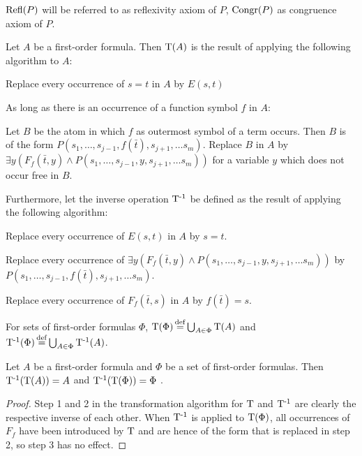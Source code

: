 $\operatorname{Refl}(P)$ will be referred to as reflexivity axiom of $P$, $\operatorname{Congr}(P)$ as congruence axiom of $P$.

\begin{defi}[label=exa:cont]
	\label{def:trans}
	Let $A$ be a first-order formula. Then $\operatorname{T}(A)$ is the result of applying the following algorithm to $A$:
	\begin{compactenum}
	\item Replace every occurrence of $s=t$ in $A$ by $E(s, t)$
	\label{def:trans_step1}
	\item As long as there is an occurrence of a function symbol $f$ in $A$:
	\label{def:trans_step2}

		Let $B$ be the atom in which $f$ as outermost symbol of a term occurs.
		Then $B$ is of the form $P(s_1, \ldots, s_{j-1}, f(\bar t),\allowbreak s_{j+1}, \ldots s_m)$.
		Replace $B$ in $A$ by $\exists y (F_f(\bar t, y) \land P(s_1, \ldots, s_{j-1}, y, s_{j+1}, \ldots s_m))$ for a variable $y$ which does not occur free in $B$.
	\end{compactenum}

	Furthermore, let the inverse operation $\operatorname{T^{-1}}$ be defined as the result of applying the following algorithm:
	\begin{compactenum}
	\item Replace every occurrence of $E(s, t)$ in $A$ by $s=t$.
	\item Replace every occurrence of 
		$\exists y (F_f(\bar t, y) \land P(s_1, \ldots, s_{j-1}, y, s_{j+1}, \ldots s_m))$
		by $P(s_1, \ldots, s_{j-1}, f(\bar t),\allowbreak s_{j+1}, \ldots s_m)$.
	\item Replace every occurrence of $F_f(\bar t, s)$ in $A$ by $f(\bar t) = s$.
	\end{compactenum}

	For sets of first-order formulas $\Phi$, $\operatorname{T}(\Phi) \operatorname{\stackrel{\mathrm{def}}{=}} \bigcup_{A\in\Phi} \operatorname{T}(A)$ and 
$\operatorname{T^{-1}}(\Phi) \operatorname{\stackrel{\mathrm{def}}{=}} \bigcup_{A\in\Phi} \operatorname{T^{-1}}(A)$.
\end{defi}

\begin{lemma}
	\label{lemma:tinv}
	Let $A$ be a first-order formula and $\Phi$ be a set of first-order formulas.
	Then 
	$\operatorname{T^{-1}}(\operatorname{T}(A)) = A$
	and
	$\operatorname{T^{-1}}(\operatorname{T}(\Phi)) = \Phi$
	.
\end{lemma}
\begin{proof}
	Step 1 and 2 in the transformation algorithm for $\operatorname{T}$ and $\operatorname{T^{-1}}$ are clearly the respective inverse of each other.
	When $\operatorname{T^{-1}}$ is applied to $\operatorname{T}(\Phi)$, all occurrences of $F_f$ have been introduced by $\operatorname{T}$ and are hence of the form that is replaced in step 2, so step 3 has no effect. 
\end{proof}

